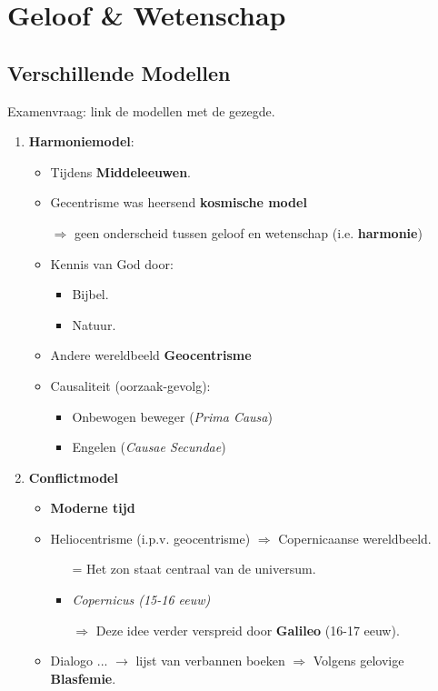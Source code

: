 \section{Geloof \& Wetenschap}
\subsection*{Verschillende Modellen}
Examenvraag: link de modellen met de gezegde.
\begin{enumerate}
	\item \textbf{Harmoniemodel}:
	\begin{itemize}
		\item Tijdens \textbf{Middeleeuwen}.
		\item  Gecentrisme was heersend \textbf{kosmische model}
		\item[$\Rightarrow$] geen onderscheid tussen geloof en wetenschap (i.e. \textbf{harmonie})
		\item Kennis van God door:
		\begin{itemize}
			\item Bijbel.
			\item  Natuur.
		\end{itemize}
		\item Andere wereldbeeld \textbf{Geocentrisme}
		\item Causaliteit (oorzaak-gevolg):
		\begin{itemize}
			\item Onbewogen beweger (\textit{Prima Causa})
			\item Engelen (\textit{Causae Secundae})
		\end{itemize}
	\end{itemize}
	\item \textbf{Conflictmodel}
	\begin{itemize}
		\item \textbf{Moderne tijd}
		\item Heliocentrisme (i.p.v. geocentrisme) $\Rightarrow$ Copernicaanse wereldbeeld.
		\begin{itemize}
			\item[=] Het zon staat centraal van de universum.
			\item  \textit{Copernicus (15-16 eeuw)}
			\item[$\Rightarrow$] Deze idee verder verspreid door \textbf{Galileo} (16-17 eeuw).
		\end{itemize}
		\item Dialogo ... $\rightarrow$ lijst van verbannen boeken $\Rightarrow$ Volgens gelovige \textbf{Blasfemie}.

\end{itemize}
\end{enumerate}
